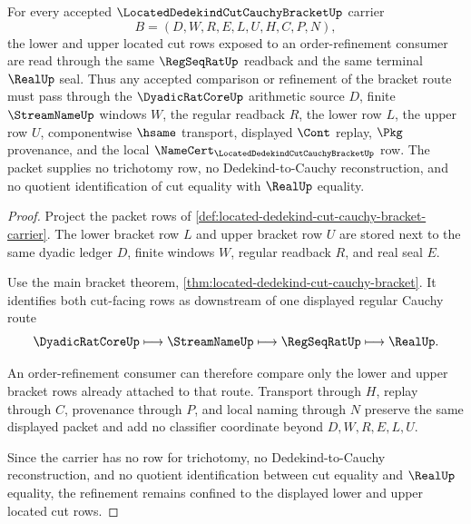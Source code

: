 \begin{theorem}
\label{thm:located-dedekind-cut-cauchy-bracket-order-refinement}
For every accepted $\LocatedDedekindCutCauchyBracketUp$ carrier
$$
B=(D,W,R,E,L,U,H,C,P,N),
$$
the lower and upper located cut rows exposed to an order-refinement consumer are read through the same $\RegSeqRatUp$ readback and the same terminal $\RealUp$ seal. Thus any accepted comparison or refinement of the bracket route must pass through the $\DyadicRatCoreUp$ arithmetic source $D$, finite $\StreamNameUp$ windows $W$, the regular readback $R$, the lower row $L$, the upper row $U$, componentwise $\hsame$ transport, displayed $\Cont$ replay, $\Pkg$ provenance, and the local $\NameCert_{\LocatedDedekindCutCauchyBracketUp}$ row. The packet supplies no trichotomy row, no Dedekind-to-Cauchy reconstruction, and no quotient identification of cut equality with $\RealUp$ equality.
\end{theorem}
\begin{proof}
Project the packet rows of \autoref{def:located-dedekind-cut-cauchy-bracket-carrier}. The lower bracket row $L$ and upper bracket row $U$ are stored next to the same dyadic ledger $D$, finite windows $W$, regular readback $R$, and real seal $E$.

Use the main bracket theorem, \autoref{thm:located-dedekind-cut-cauchy-bracket}. It identifies both cut-facing rows as downstream of one displayed regular Cauchy route
$$
\DyadicRatCoreUp \longmapsto \StreamNameUp \longmapsto \RegSeqRatUp \longmapsto \RealUp .
$$

An order-refinement consumer can therefore compare only the lower and upper bracket rows already attached to that route. Transport through $H$, replay through $C$, provenance through $P$, and local naming through $N$ preserve the same displayed packet and add no classifier coordinate beyond $D,W,R,E,L,U$.

Since the carrier has no row for trichotomy, no Dedekind-to-Cauchy reconstruction, and no quotient identification between cut equality and $\RealUp$ equality, the refinement remains confined to the displayed lower and upper located cut rows.
\end{proof}


